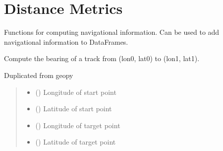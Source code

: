 \documentclass[letterpaper,10pt,english]{sphinxmanual}
\begin{document}

\section{Distance Metrics}
\label{\detokenize{users_guide:distance-metrics}}\label{\detokenize{users_guide:module-geotrees.distance_metrics}}
\sphinxAtStartPar
Functions for computing navigational information. Can be used to add
navigational information to DataFrames.

\begin{fulllineitems}
\label{\detokenize{users_guide:geotrees.distance_metrics.bearing}}
\pysigstartsignatures
\pysiglinewithargsret
{}
{\sphinxparamcomma {}\sphinxparamcomma {}\sphinxparamcomma {}}
{}
\pysigstopsignatures
\sphinxAtStartPar
Compute the bearing of a track from (lon0, lat0) to (lon1, lat1).

\sphinxAtStartPar
Duplicated from geo\sphinxhyphen{}py
\begin{quote}\begin{description}
\begin{itemize}
\item {}
\sphinxAtStartPar
{} (\sphinxstyleliteralemphasis{\sphinxupquote{,}}) \textendash{} Longitude of start point

\item {}
\sphinxAtStartPar
{} (\sphinxstyleliteralemphasis{\sphinxupquote{,}}) \textendash{} Latitude of start point

\item {}
\sphinxAtStartPar
{} (\sphinxstyleliteralemphasis{\sphinxupquote{,}}) \textendash{} Longitude of target point

\item {}
\sphinxAtStartPar
{} (\sphinxstyleliteralemphasis{\sphinxupquote{,}}) \textendash{} Latitude of target point


\end{itemize}
\end{description}
\end{quote}
\end{fulllineitems}
\end{document}
